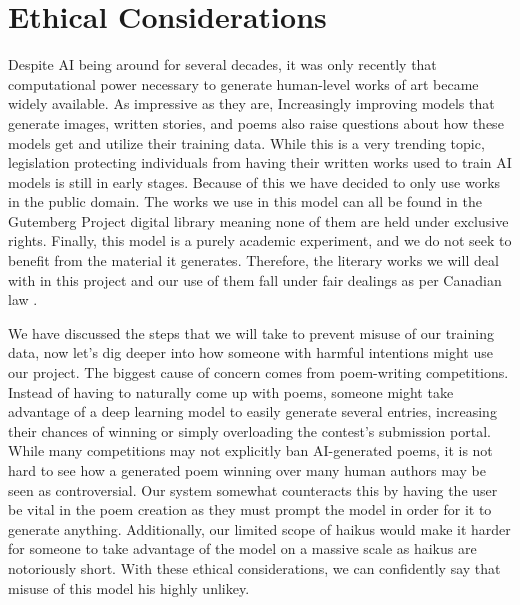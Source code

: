 \documentclass{article} %
\begin{document}
\section{Ethical Considerations}

Despite AI being around for several decades, it was only recently that computational power necessary to generate human-level works of art became widely available.
As impressive as they are, Increasingly improving models that generate images, written stories, and poems also raise questions about how these models get and utilize their training data.
While this is a very trending topic, legislation protecting individuals from having their written works used to train AI models is still in early stages.
Because of this we have decided to only use works in the public domain.
The works we use in this model can all be found in the Gutemberg Project digital library meaning none of them are held under exclusive rights.
Finally, this model is a purely academic experiment, and we do not seek to benefit from the material it generates.
Therefore, the literary works we will deal with in this project and our use of them fall under fair dealings as per Canadian law \citep{LegislativeServicesBranch_2024} .

We have discussed the steps that we will take to prevent misuse of our training data, now let's dig deeper into how someone with harmful intentions might use our project.
The biggest cause of concern comes from poem-writing competitions.
Instead of having to naturally come up with poems, someone might take advantage of a deep learning model to easily generate several entries, increasing their chances of winning or simply overloading the contest's submission portal.
While many competitions may not explicitly ban AI-generated poems, it is not hard to see how a generated poem winning over many human authors may be seen as controversial.
Our system somewhat counteracts this by having the user be vital in the poem creation as they must prompt the model in order for it to generate anything.
Additionally, our limited scope of haikus would make it harder for someone to take advantage of the model on a massive scale as haikus are notoriously short.
With these ethical considerations, we can confidently say that misuse of this model his highly unlikey.



\newpage
\clearpage

\label{last_page}



\end{document}
